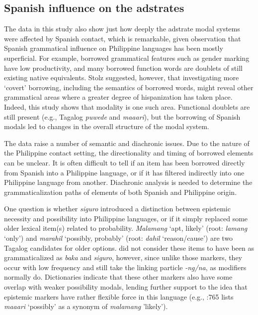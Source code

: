 \documentclass[output=paper]{langsci/langscibook}
\begin{document}
\subsection{Spanish influence on the adstrates}

The data in this study also show just how deeply the adstrate modal systems were affected by Spanish contact, which is remarkable, given  observation that Spanish grammatical influence on Philippine languages has been mostly superficial. For example, borrowed grammatical features such as gender marking have low productivity, and many borrowed function words are doublets of still existing native equivalents. Stolz suggested, however, that investigating more ‘covert’ borrowing, including the semantics of borrowed words, might reveal other grammatical areas where a greater degree of hispanization has taken place. Indeed, this study shows that modality is one such area. Functional doublets are still present (e.g., Tagalog \textit{puwede} and \textit{maaari}), but the borrowing of Spanish modals led to changes in the overall structure of the modal system.

The data raise a number of semantic and diachronic issues. Due to the nature of the Philippine contact setting, the directionality and timing of borrowed elements can be unclear. It is often difficult to tell if an item has been borrowed directly from Spanish into a Philippine language, or if it has filtered indirectly into one Philippine language from another. Diachronic analysis is needed to determine the grammaticalization paths of elements of both Spanish and Philippine origin. 

One question is whether \textit{siguro} introduced a distinction between epistemic necessity and possibility into Philippine languages, or if it simply replaced some older lexical item(s) related to probability. \textit{Malamang} ‘apt, likely’ (root: \textit{lamang} ‘only’) and \textit{marahil} ‘possibly, probably’ (root: \textit{dahil} ‘reason/cause’) are two Tagalog candidates for older options. \citet{BaderEtAl1994} did not consider these items to have been as grammaticalized as \textit{baka} and \textit{siguro}, however, since unlike those markers, they occur with low frequency and still take the linking particle \textit{{}-ng/na}, as modifiers normally do. Dictionaries indicate that these other markers also have some overlap with weaker possibility modals, lending further support to the idea that epistemic markers have rather flexible force in this language (e.g., \citealt{English2010}:765 lists \textit{maaari} ‘possibly’ as a synonym of \textit{malamang} 'likely'). 
\end{document}
